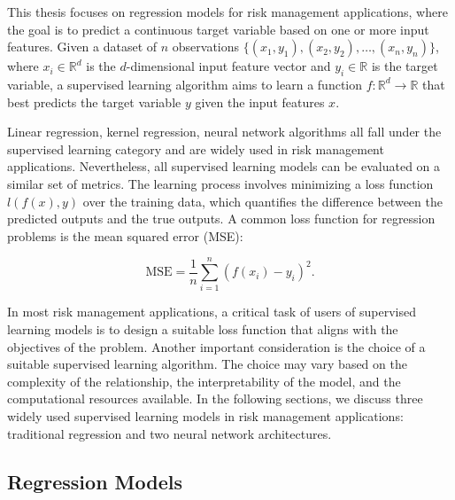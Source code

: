 This thesis focuses on regression models for risk management applications, where the goal is to predict a continuous target variable based on one or more input features.
Given a dataset of $n$ observations $\{(x_1, y_1), (x_2, y_2), \ldots, (x_n, y_n)\}$, where $x_i \in \mathbb{R}^d$ is the $d$-dimensional input feature vector and $y_i \in \mathbb{R}$ is the target variable, a supervised learning algorithm aims to learn a function $f: \mathbb{R}^d \rightarrow \mathbb{R}$ that best predicts the target variable $y$ given the input features $x$.

Linear regression, kernel regression, neural network algorithms all fall under the supervised learning category and are widely used in risk management applications.
Nevertheless, all supervised learning models can be evaluated on a similar set of metrics.
The learning process involves minimizing a loss function $l(f(x),y)$ over the training data, which quantifies the difference between the predicted outputs and the true outputs. 
A common loss function for regression problems is the mean squared error (MSE):

\begin{equation}
    \text{MSE} = \frac{1}{n} \sum_{i=1}^{n} (f(x_i) - y_i)^2.
\end{equation}

In most risk management applications, a critical task of users of supervised learning models is to design a suitable loss function that aligns with the objectives of the problem.
Another important consideration is the choice of a suitable supervised learning algorithm.
The choice may vary based on the complexity of the relationship, the interpretability of the model, and the computational resources available.
In the following sections, we discuss three widely used supervised learning models in risk management applications: traditional regression and two neural network architectures.

\subsection{Regression Models}

